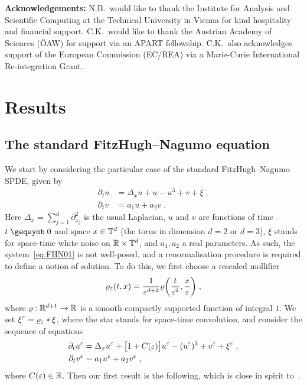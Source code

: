 \documentclass[reqno,11pt]{article}
\begin{document}
\medskip

\noindent
\textbf{Acknowledgements:} {N.B.}~would like to thank the Institute for Analysis
and Scientific Computing at the Technical University in Vienna for kind
hospitality and financial support. {C.K.}~would like to thank the Austrian
Academy of Sciences ({\"{O}AW}) for support via an APART fellowship. {C.K.}~also
acknowledges support of the European Commission (EC/REA) via a Marie-Curie
International Re-integration Grant.


\section{Results}
\label{sec_res}


\subsection{The standard FitzHugh--Nagumo equation}
\label{ssec_rfhn}

We start by considering the particular case of the standard
FitzHugh--Nagumo SPDE, given by 
\begin{align}
\nonumber
\partial_t u &= \Delta_x u + u - u^3 + v + \xi\;, \\
\partial_t v &= a_1 u + a_2 v\;. 
\label{eq:FHN01} 
\end{align}
Here $\Delta_x=\sum_{j=1}^d \partial_{x_j}^2$ is the usual Laplacian, 
$u$ and $v$ are functions of time $t\geqs0$ and space $x\in\mathbb{T}^d$ (the torus
in dimension $d=2$ or $d=3$), $\xi$ stands for space-time white noise on
$\mathbb{R}\times\mathbb{T}^d$, and $a_1, a_2$ a real parameters. As such, the
system~\eqref{eq:FHN01} is not well-posed, and a renormalisation procedure is
required to define a notion of solution. To do this, we first choose a rescaled
mollifier 
\begin{equation}
 \label{eq:FHN02}
 \varrho_\eps(t,x) = \frac{1}{\eps^{d+2}}
\varrho\biggpar{\frac{t}{\eps^2},\frac{x}{\eps}}\;,
\end{equation} 
where $\varrho:\mathbb{R}^{d+1}\to\mathbb{R}$ is a smooth compactly supported function of
integral $1$. We set $\xi^\varepsilon=\varrho_\varepsilon*\xi$, where the star stands for
space-time convolution, and consider the sequence of equations 
\begin{align}
\nonumber
\partial_t u^\eps &= \Delta_x u^\eps + \bigbrak{1+C(\eps)}u^\eps - (u^\eps)^3
+ v^\eps + \xi^\eps\;, \\
\partial_t v^\eps &= a_1 u^\eps + a_2 v^\eps\;, 
\label{eq:FHN03} 
\end{align}
where $C(\varepsilon)\in\mathbb{R}$. 
Then our first result is the following, which is close in spirit
to~\cite[Thm.~1.15]{Hairer2014}. 
\end{document}
